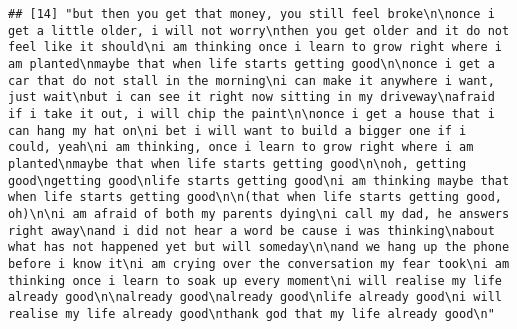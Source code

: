 \documentclass[]{article}
\begin{document}
\begin{verbatim}
## [14] "but then you get that money, you still feel broke\n\nonce i get a little older, i will not worry\nthen you get older and it do not feel like it should\ni am thinking once i learn to grow right where i am planted\nmaybe that when life starts getting good\n\nonce i get a car that do not stall in the morning\ni can make it anywhere i want, just wait\nbut i can see it right now sitting in my driveway\nafraid if i take it out, i will chip the paint\n\nonce i get a house that i can hang my hat on\ni bet i will want to build a bigger one if i could, yeah\ni am thinking, once i learn to grow right where i am planted\nmaybe that when life starts getting good\n\noh, getting good\ngetting good\nlife starts getting good\ni am thinking maybe that when life starts getting good\n\n(that when life starts getting good, oh)\n\ni am afraid of both my parents dying\ni call my dad, he answers right away\nand i did not hear a word be cause i was thinking\nabout what has not happened yet but will someday\n\nand we hang up the phone before i know it\ni am crying over the conversation my fear took\ni am thinking once i learn to soak up every moment\ni will realise my life already good\n\nalready good\nalready good\nlife already good\ni will realise my life already good\nthank god that my life already good\n"                                                                                                                                                                                                                                                                                                                                                                                                                                                                                                                                                                                                                                                                                                                                                                                                                                                                                                                                                                                                                                                                                                                                                                                                                                                                                                                                                                                                                                                                                                                                                                                                                          

\end{verbatim}
\end{document}
